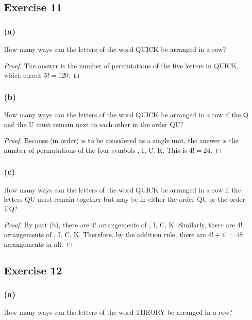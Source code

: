 \documentclass[14pt]{extarticle}
\begin{document}
\subsection{Exercise 11}
\subsubsection{(a)}
How many ways can the letters of the word QUICK be arranged in a row?

\begin{proof}
The answer is the number of permutations of the five letters in QUICK, which equals \(5! = 120\).
\end{proof}

\subsubsection{(b)}
How many ways can the letters of the word QUICK be arranged in a row if the Q and the U must remain next to each other 
in the order QU?

\begin{proof}
Because  (in order) is to be considered as a single unit, the answer is the number of permutations of 
the four symbols , I, C, K. This is \(4! = 24\).
\end{proof}

\subsubsection{(c)}
How many ways can the letters of the word QUICK be arranged in a row if the letters QU must remain together but may be 
in either the order QU or the order UQ?

\begin{proof}
By part (b), there are 4! arrangements of , I, C, K. Similarly, there are 4! arrangements of , I, 
C, K. Therefore, by the addition rule, there are \(4! + 4! = 48\) arrangements in all.
\end{proof}

\subsection{Exercise 12}
\subsubsection{(a)}
How many ways can the letters of the word THEORY be arranged in a row?
\end{document}
